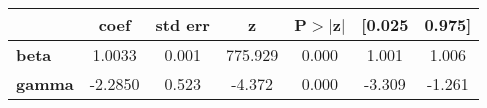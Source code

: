 \begin{center}
\begin{tabular}{lcccccc}
\toprule
               & \textbf{coef} & \textbf{std err} & \textbf{z} & \textbf{P$> |$z$|$} & \textbf{[0.025} & \textbf{0.975]}  \\
\midrule
\textbf{beta}  &       1.0033  &        0.001     &   775.929  &         0.000        &        1.001    &        1.006     \\
\textbf{gamma} &      -2.2850  &        0.523     &    -4.372  &         0.000        &       -3.309    &       -1.261     \\
\bottomrule
\end{tabular}
\end{center}